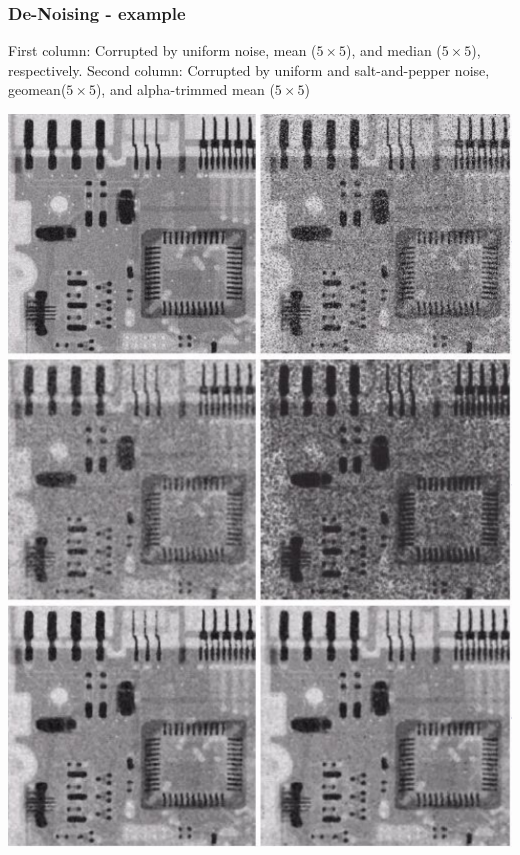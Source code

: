 \documentclass{beamer}
\begin{document}
\begin{frame}
\frametitle{De-Noising - example}
\scriptsize{First column: Corrupted by uniform noise, mean ($5\times 5$), and median ($ 5\times 5$), respectively. Second column: Corrupted by uniform and salt-and-pepper noise, geomean($5\times 5$), and alpha-trimmed mean ($5\times 5$)}\\
\begin{center}
\includegraphics[scale=0.3]{images/L5_ex_allmedian.png}
\end{center}
\end{frame}

\end{document}

